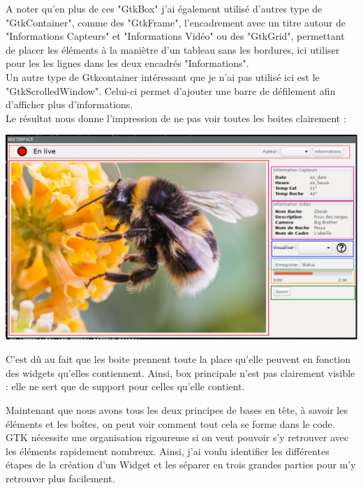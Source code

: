 \documentclass[11pt,french,a4paper]{report}
\begin{document}
A noter qu'en plus de ces "GtkBox" j'ai également utilisé d'autres type de "GtkContainer", comme des "GtkFrame", l'encadrement
avec un titre autour de "Informations Capteurs" et "Informations Vidéo" ou des "GtkGrid", permettant de placer les éléments 
à la maniètre d'un tableau sans les bordures, ici utiliser pour les les lignes dans les deux encadrés "Informations". \\
Un autre type de Gtkcontainer intéressant que je n'ai pas utilisé ici est le "GtkScrolledWindow". Celui-ci permet d'ajouter
une barre de défilement afin d'afficher plus d'informations. \\

Le résultat nous donne l'impression de ne pas voir toutes les boites clairement : \\

\begin{center}
\includegraphics[scale=0.45]{../images/dia/schema_bloc_win_applique.png} \\
\end{center}

C'est dû au fait que les boite prennent toute la place qu'elle peuvent en fonction des widgets qu'elles contiennent. Ainsi, box principale 
n'est pas clairement visible : elle ne sert que de support pour celles qu'elle contient. 

Maintenant que nous avons tous les deux principes de bases en tête, à savoir les éléments et les boîtes, on peut voir comment 
tout cela se forme dans le code. \\

GTK nécessite une organisation rigoureuse si on veut pouvoir s'y retrouver avec les éléments rapidement nombreux.
Ainsi, j'ai voulu identifier les différentes étapes de la création d'un Widget et les séparer en 
trois grandes parties pour m'y retrouver plus facilement. \\
\end{document}
